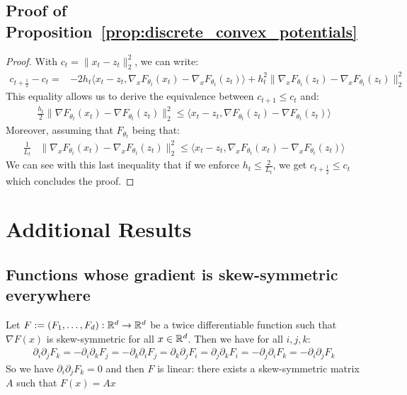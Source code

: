 \subsection{Proof of Proposition~\ref{prop:discrete_convex_potentials}}
\label{proof:discrete_convex_potentials}
\begin{proof}
With $c_t = \lVert x_t -z_t\rVert_2^2$, we can write:
\begin{align*}
   c_{t+\frac12} - c_t = &-2 h_t \big\langle x_t - z_t, \nabla_xF_{\theta_{t}}(x_t) - \nabla_xF_{\theta_{t}}(z_t)  \big\rangle+ h_t^2 \lVert \nabla_xF_{\theta_{t}}(z_t) - \nabla_xF_{\theta_{t}}(z_t)\rVert_2^2
\end{align*}
This equality allows us to derive the equivalence between  $c_{t+1} \leq c_t$ and: 
\begin{align*}
   \frac{h_t}{2}
   \lVert  \nabla F_{\theta_{t}}(x_t) - \nabla F_{\theta_{t}}(z_t)\rVert_2^2
   \leq
   \langle x_t -z_t, \nabla F_{\theta_{t}}(z_t) - \nabla F_{\theta_{t}}(z_t) \rangle 
\end{align*}
Moreover, assuming that $F_{\theta_t}$ being  that:
\begin{align*}
   \frac{1}{L_t} &\lVert \nabla_xF_{\theta_{t}}(x_t) - \nabla_xF_{\theta_{t}}(z_t)\rVert_2^2 
   \leq\big\langle x_t -z_t, \nabla_xF_{\theta_{t}}(x_t) - \nabla_xF_{\theta_{t}}(z_t) \big\rangle
\end{align*}
We can see with this last inequality that if we enforce  $h_t \leq \frac{2}{L_t}$, we get $c_{t+\frac12} \leq c_t$ which concludes the proof.
\end{proof}


\section{Additional Results}

\subsection{Functions whose gradient is skew-symmetric everywhere}
\label{sup:skew}
Let $F:=(F_1,\dots,F_d):\mathbb{R}^d\to\mathbb{R}^d$ be a twice differentiable function such that $\nabla F(x)$ is skew-symmetric for all $x\in\mathbb{R}^d$. Then we have for all $i,j,k$:
\begin{align*}
    \partial_i\partial_j F_k =  -\partial_i\partial_k F_j =-\partial_k\partial_i F_j = \partial_k\partial_j F_i = \partial_j\partial_k F_i = -\partial_j\partial_i F_k = -\partial_i\partial_j F_k
\end{align*}
So we have $\partial_i\partial_j F_k =0$ and then $F$ is linear: there exists a skew-symmetric matrix $A$ such that $F(x)=Ax$ 


